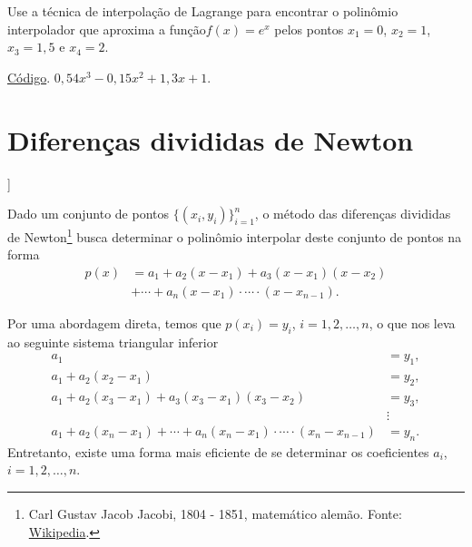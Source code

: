 \begin{exer}
  Use a técnica de interpolação de Lagrange para encontrar o polinômio interpolador que aproxima a função$f(x)=e^{x}$ pelos pontos $x_1=0$, $x_2=1$, $x_3=1,5$ e $x_4=2$.
\end{exer}
\begin{resp}
\ifisoctave
\href{https://github.com/phkonzen/notas/blob/master/src/MatematicaNumerica/cap_interp/dados/exer_interpoli_aprox1/exer_interpoli_aprox1.m}{Código}.
\fi
$0,54x^3 - 0,15x^2 + 1,3x + 1$.
\end{resp}

\section{Diferenças divididas de Newton}\label{cap_interp_difdiv}

\begin{flushleft}
  [[tag:revisar]]
\end{flushleft}

Dado um conjunto de pontos $\{(x_i, y_i)\}_{i=1}^n$, o método das diferenças divididas de Newton\footnote{Carl Gustav Jacob Jacobi, 1804 - 1851, matemático alemão. Fonte: \href{https://en.wikipedia.org/wiki/Carl_Gustav_Jacob_Jacobi}{Wikipedia}.} busca determinar o polinômio interpolar deste conjunto de pontos na forma
\begin{align}
  p(x) &= a_1 + a_2(x-x_1) + a_3(x-x_1)(x-x_2)\\
       &+ \cdots + a_{n}(x-x_1)\cdot \cdots \cdot (x-x_{n-1}).
\end{align}

Por uma abordagem direta, temos que $p(x_i)=y_i$, $i=1, 2, \dotsc, n$, o que nos leva ao seguinte sistema triangular inferior
\begin{align}
  a_1 &= y_1, \\
  a_1 + a_2(x_2-x_1) &= y_2, \\
  a_1 + a_2(x_3-x_1) + a_3(x_3-x_1)(x_3-x_2) &= y_3, \\
  &\vdots\\
  a_1 + a_2(x_n-x_1) + \cdots + a_{n}(x_n-x_1)\cdot\cdots\cdot(x_n-x_{n-1}) &= y_n.
\end{align}
Entretanto, existe uma forma mais eficiente de se determinar os coeficientes $a_i$, $i=1, 2, \dotsc, n$.

